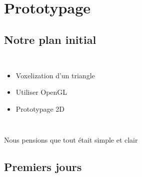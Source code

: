 \section{Prototypage}

\subsection{Notre plan initial}

\begin{frame}[fragile=singleslide]{\insertsectionhead}
  \framesubtitle{\insertsubsectionhead}
  \begin{columns}[T,onlytextwidth]
      \begin{itemize}
        \item Voxelization d'un triangle
        \item Utiliser OpenGL
        \item Prototypage 2D
      \end{itemize}
      \begin{figure}
        \begin{subfigure}{0.4\textwidth}
        \end{subfigure}
      \end{figure}
  \end{columns}
  \vfill
  \vfill
  \hspace{0.2cm}
  {\large Nous pensions que tout était simple et clair}
\end{frame}

\subsection{Premiers jours}

